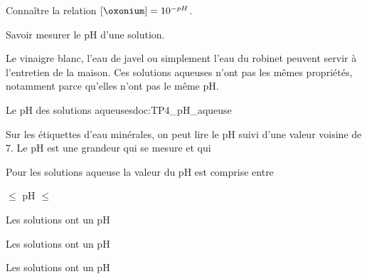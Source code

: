 \tetePremStssChim
\vspace*{-36pt}

\begin{objectifs}
  \item Connaître la relation $[\oxonium] = 10^{-pH}$.
  \item Savoir mesurer le pH d'une solution.
\end{objectifs}


\begin{contexte}
  Le vinaigre blanc, l'eau de javel ou simplement l'eau du robinet peuvent servir à l'entretien de la maison.
  Ces solutions aqueuses n'ont pas les mêmes propriétés, notamment parce qu'elles n'ont pas le même pH.

\end{contexte}


\begin{doc}{Le pH des solutions aqueuses}{doc:TP4_pH_aqueuse}
  \begin{wrapfigure}[3]{r}{0.1\linewidth}
  \end{wrapfigure}
  
  Sur les étiquettes d'eau minérales, on peut lire le pH suivi d'une valeur voisine de 7.
  Le pH est une grandeur qui se mesure et qui 
  
  \begin{importants}
    Pour les solutions aqueuse la valeur du pH est comprise entre
    \begin{center}
       $\leq$ pH $\leq$ 
    \end{center}
  \end{importants}

  \begin{importants}
    \begin{listePoints}
      \item Les solutions  ont un pH 
      \item Les solutions  ont un pH 
      \item Les solutions  ont un pH 
    \end{listePoints}
  \end{importants}
\end{doc}

